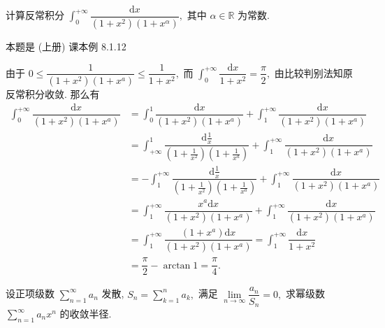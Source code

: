 
\begin{question}[points = 10]
计算反常积分 $\int_0^{+\infty} \dfrac{\mathrm{d} x}{(1+x^2)(1+x^{\alpha})},$ 其中 $\alpha \in \mathbb{R}$ 为常数.

\end{question}

\begin{solution}
本题是 (上册) 课本例 8.1.12

由于 $0 \leqslant \dfrac{1}{(1 + x^2)(1 + x^a)} \leqslant \dfrac{1}{1 + x^2},$ 而 $\int_0^{+\infty} \dfrac{\mathrm{d} x}{1 + x^2} = \dfrac{\pi}{2},$ 由比较判别法知原反常积分收敛. 那么有
\begin{align*}
\int_0^{+\infty} \dfrac{\mathrm{d} x}{(1 + x^2)(1 + x^a)} & = \int_0^1 \dfrac{\mathrm{d} x}{(1 + x^2)(1 + x^a)} + \int_1^{+\infty} \dfrac{\mathrm{d} x}{(1 + x^2)(1 + x^a)} \\
& = \int_{+\infty}^1 \dfrac{\mathrm{d} \frac{1}{x}}{(1 + \frac{1}{x^2})(1 + \frac{1}{x^a})} + \int_1^{+\infty} \dfrac{\mathrm{d} x}{(1 + x^2)(1 + x^a)} \\
& = -\int_1^{+\infty} \dfrac{\mathrm{d} \frac{1}{x}}{(1 + \frac{1}{x^2})(1 + \frac{1}{x^a})} + \int_1^{+\infty} \dfrac{\mathrm{d} x}{(1 + x^2)(1 + x^a)} \\
& = \int_1^{+\infty} \dfrac{x^a \mathrm{d} x}{(1 + x^2)(1 + x^a)} + \int_1^{+\infty} \dfrac{\mathrm{d} x}{(1 + x^2)(1 + x^a)} \\
& = \int_1^{+\infty} \dfrac{(1 + x^a) \mathrm{d} x}{(1 + x^2)(1 + x^a)} = \int_1^{+\infty} \dfrac{\mathrm{d} x}{1 + x^2} \\
& = \dfrac{\pi}{2} - \arctan 1 = \dfrac{\pi}{4}.
\end{align*}
\end{solution}

\begin{question}[points = 10]
设正项级数 $\sum\limits_{n=1}^{\infty} a_n$ 发散, $S_n = \sum\limits_{k=1}^{n} a_k,$ 满足 $\lim\limits_{n\to\infty} \dfrac{a_n}{S_n} = 0,$ 求幂级数 $\sum\limits_{n=1}^{\infty} a_n x^n$ 的收敛半径.

\end{question}

